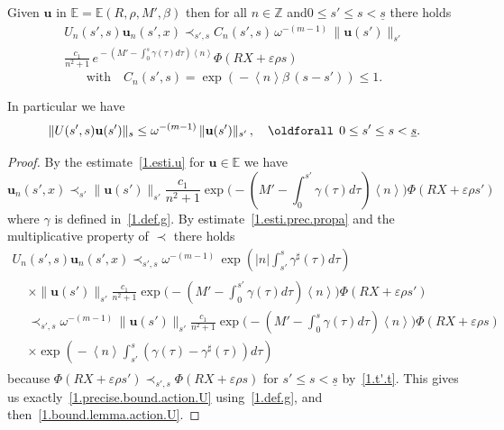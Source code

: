 \documentclass[AHL,Unicode,longabstracts,published]{cedram}
\theoremstyle{plain}
\newcommand*\e{\varepsilon}
\newcommand*\Z{{\mathbb Z}}
\newcommand*\EE{{\mathbb E}}
\newcommand*\g{\gamma}
\newcommand{\ubf}{{\mathbf u}}
\newcommand*\und{\underline}
\renewcommand*{\forall}{\mathrel{\oldforall}}
\begin{document}
\begin{lemm}\label{1.lemma.action.U}
Given $\ubf$ in $\EE = \EE(R,\rho,M',\beta)$ then for all $n\in\Z$ and\linebreak$0 \leq s' \leq s < \und{s}$ there holds
\begin{multline}\label{1.precise.bound.action.U}
U_n(s',s)\ubf_n(s',x)
\prec_{s',s} C_n(s',s) \,\omega^{-(m-1)}\,\|\ubf(s')\|_{s'}\\ \frac{\displaystyle c_1}{\displaystyle n^2+1} \, e^{{}-(M'-\int_{0}^{s}\g(\tau) d\tau)\left< n \right>} \Phi\left(R X+\e\rho s\right)
\end{multline}
\begin{equation}\label{1.defi.Cn}
\text{with} \quad C_n(s',s) = \exp\left({}- \left<n\right> \beta \,(s-s') \right) \leq 1.
\end{equation}

In particular we have
\begin{equation}\label{1.bound.lemma.action.U}
\|U(s',s)\ubf(s')\|_s \leq \omega^{-(m-1)}\, \|\ubf(s')\|_{s'} \,, \quad \forall \, 0 \leq s' \leq s < \und{s}.
\end{equation}
\end{lemm}

\begin{proof}
By the estimate~\eqref{1.esti.u} for $\ubf\in\EE$ we have
\[
\ubf_n(s',x)
\prec_{s'} \|\ubf(s')\|_{s'} \frac{\displaystyle c_1}{\displaystyle n^2+1}\exp\Big({}-(M' - \int_{0}^{s'} \g(\tau)d\tau)\left< n \right>\Big) \Phi\left(R X+\e\rho s'\right)
\]
where $\g$ is defined in~\eqref{1.def.g}. By estimate~\eqref{1.esti.prec.propa} and the multiplicative property of $\prec$ there holds
\begin{multline*}
U_n(s',s)\ubf_n(s',x) \prec_{s',s} \omega^{-(m-1)}\,\exp\left(|n| \int_{s'}^{s} \g^{\sharp}(\tau) d\tau \right) \\
\begin{aligned}
& \times\|\ubf(s')\|_{s'} \frac{\displaystyle c_1}{\displaystyle n^2+1}\exp\Big({}-(M'- \int_{0}^{s'} \g(\tau)d\tau)\left< n \right>\Big) \Phi\left(R X+\e\rho s'\right) \\
& \prec_{s',s} \omega^{-(m-1)}\,\|\ubf(s')\|_{s'} \frac{\displaystyle c_1}{\displaystyle n^2+1}\exp\Big({}-(M' - \int_{0}^{s} \g(\tau)d\tau)\left< n \right>\Big) \Phi\left(R X+\e\rho s\right) \\
& \times \exp\left({}- \left<n\right> \int_{s'}^{s} \left(\g(\tau) - \g^{\sharp}(\tau) \right) d\tau \right)
\end{aligned}
\end{multline*}
because $\Phi(R X + \e\rho s') \prec_{s',s} \Phi(R X + \e\rho s)$ for $s' \leq s < \und{s}$ by~\eqref{1.t'.t}. This gives us exactly~\eqref{1.precise.bound.action.U} using~\eqref{1.def.g}, and then~\eqref{1.bound.lemma.action.U}.
\end{proof}
\end{document}

